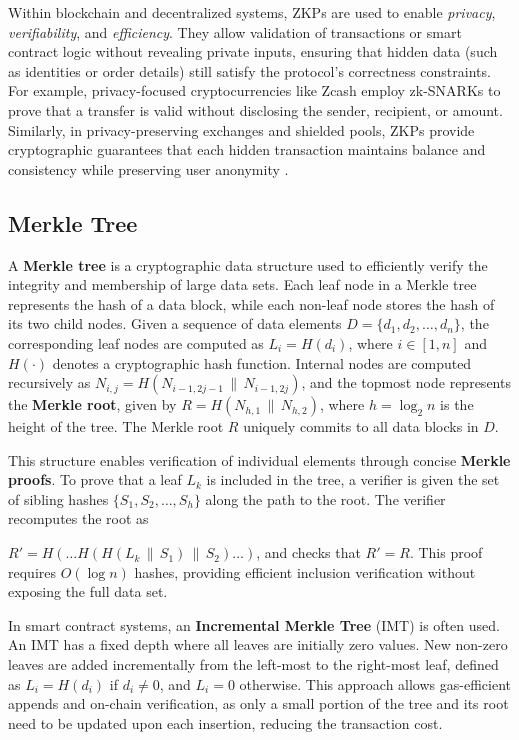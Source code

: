\documentclass[12pt,a4paper]{article}
\begin{document}
Within blockchain and decentralized systems, ZKPs are used to enable \textit{privacy}, \textit{verifiability}, and \textit{efficiency}.  
They allow validation of transactions or smart contract logic without revealing private inputs, ensuring that hidden data (such as identities or order details) still satisfy the protocol’s correctness constraints.  
For example, privacy-focused cryptocurrencies like Zcash employ zk-SNARKs to prove that a transfer is valid without disclosing the sender, recipient, or amount.  
Similarly, in privacy-preserving exchanges and shielded pools, ZKPs provide cryptographic guarantees that each hidden transaction maintains balance and consistency while preserving user anonymity \parencite{ding2025overview}.


\subsection{Merkle Tree}
A \textbf{Merkle tree} is a cryptographic data structure used to efficiently verify the integrity and membership of large data sets. Each leaf node in a Merkle tree represents the hash of a data block, while each non-leaf node stores the hash of its two child nodes. Given a sequence of data elements 
$D = \{d_1, d_2, \dots, d_n\}$,
the corresponding leaf nodes are computed as 
$L_i = H(d_i)$, where $i \in [1, n]$ and $H(\cdot)$ denotes a cryptographic hash function.  
Internal nodes are computed recursively as 
$N_{i,j} = H(N_{i-1,2j-1} \, \| \, N_{i-1,2j})$, 
and the topmost node represents the \textbf{Merkle root}, given by 
$R = H(N_{h,1} \, \| \, N_{h,2})$, 
where $h = \log_2 n$ is the height of the tree.  
The Merkle root $R$ uniquely commits to all data blocks in $D$.

This structure enables verification of individual elements through concise \textbf{Merkle proofs}.  
To prove that a leaf $L_k$ is included in the tree, a verifier is given the set of sibling hashes $\{S_1, S_2, \dots, S_h\}$ along the path to the root.  
The verifier recomputes the root as 

\noindent $R' = H(\dots H(H(L_k \, \| \, S_1) \, \| \, S_2) \dots)$, 
and checks that $R' = R$.  
This proof requires $O(\log n)$ hashes, providing efficient inclusion verification without exposing the full data set.

In smart contract systems, an \textbf{Incremental Merkle Tree} (IMT) is often used.  
An IMT has a fixed depth where all leaves are initially zero values.  
New non-zero leaves are added incrementally from the left-most to the right-most leaf, defined as  
$L_i = H(d_i)$ if $d_i \neq 0$, and $L_i = 0$ otherwise.  
This approach allows gas-efficient appends and on-chain verification, as only a small portion of the tree and its root need to be updated upon each insertion, reducing the transaction cost. 
\parencite{rareskillsTornadoCash}
\end{document}
